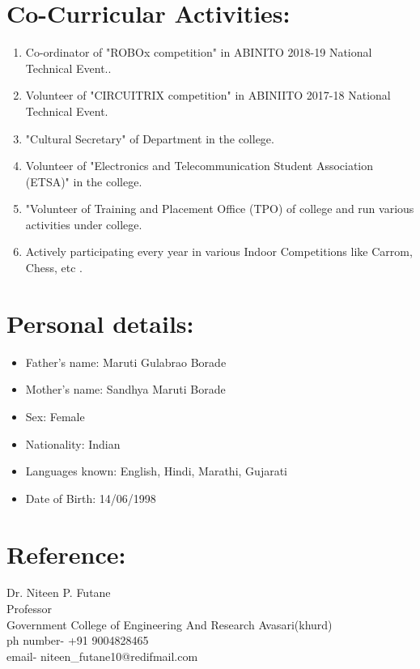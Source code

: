 \documentclass[margin,line]{res}
\begin{document}
\begin{resume}
\begin{enumerate}
	\end{enumerate}
\hfill





{\section{\Large\bf{Co-Curricular Activities:}}}
\begin{enumerate}
	\item{Co-ordinator of "ROBOx competition"  in ABINITO 2018-19 National Technical Event..}
	\item{Volunteer of "CIRCUITRIX competition" in ABINIITO 2017-18 National Technical Event.}
	 \item{"Cultural Secretary" of Department in the college.}
	 \item{Volunteer of "Electronics and Telecommunication Student Association (ETSA)" in the college.}
	 \item{"Volunteer of Training and Placement Office (TPO) of college and run various activities under college.}
	 \item{Actively participating every year in various Indoor Competitions like Carrom, Chess, etc .}
	

\end{enumerate}
\hfill






{\section{\Large\bf{Personal details:}}}
\begin{itemize}
	\item{Father's name: Maruti Gulabrao Borade}
	\item{Mother's name: Sandhya Maruti Borade}
	\item{Sex: Female} 
	\item{Nationality: Indian} 
	\item{Languages known: English, Hindi, Marathi, Gujarati} 
	\item{Date of Birth: 14/06/1998} 
\end{itemize}
\hfill






{\section{\Large \bf{Reference:}}} 
Dr. Niteen P. Futane\\
Professor\\
Government College of Engineering And Research Avasari(khurd)\\
ph number- +91 9004828465\\
email- niteen\_futane10@redifmail.com\\
\hfill\\


\end{resume}
\end{document}
